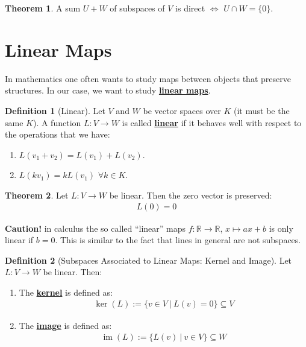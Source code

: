 \documentclass[11pt]{scrartcl}
\newcommand{\R}[0]{\mathbb{R}}
\theoremstyle{definition}
\newtheorem{theorem}{Theorem}
\newtheorem{definition}{Definition}
\theoremstyle{remark}
\newcommand{\dfn}[1]{\textbf{\underline{#1}}}
\begin{document}
\begin{theorem}
	A sum $U+W$ of subspaces of $V$ is direct $\iff$ $U \cap W = \{ 0 \}$. 
\end{theorem}

\section{Linear Maps}
In mathematics one often wants to study maps between objects that preserve structures. In our case, we want to study \dfn{linear maps}.

\begin{definition}[Linear]
	Let $V$ and $W$ be vector spaces over $K$ (it must be the same $K$). A function $L: V \rightarrow W$ is called \dfn{linear} if it behaves well with respect to the operations that we have: 
	\begin{enumerate}[noitemsep]
		\item $L(v_1 + v_2) = L(v_1) + L(v_2)$. 
		\item $L(kv_1) = kL(v_1)$ $\forall k \in K$. 
	\end{enumerate}
\end{definition}  

\begin{theorem}
	Let $L: V \rightarrow W$ be linear. Then the zero vector is preserved: 
	\begin{align}
		L(0) = 0 	
	\end{align}
\end{theorem}
\textbf{Caution!} in calculus the so called ``linear'' maps $f: \R \rightarrow \R$, $x \mapsto ax +b$ is only linear if $b=0$. This is similar to the fact that lines in general are not subspaces. 

\begin{definition}[Subspaces Associated to Linear Maps: Kernel and Image] Let $L: V \rightarrow W$ be linear. Then: 
\begin{enumerate}[noitemsep]
	\item The \dfn{kernel} is defined as: 
	\begin{align}
		\operatorname{ker}(L) := \{ v \in V\ |\ L(v) = 0 \} \subseteq V 	
	\end{align}
	\item The \dfn{image} is defined as: 
	\begin{align}
		\operatorname{im}(L) := \{ L(v)\ |\ v \in V \} \subseteq W	
	\end{align}
\end{enumerate}
\end{definition}
\end{document}
